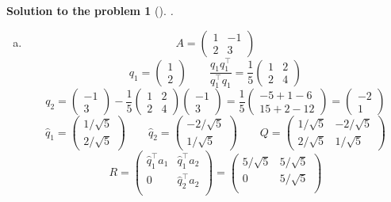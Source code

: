 \documentclass[12pt,a4]{article}
\newtheorem{solution}{Solution to the problem}
\begin{document}
\begin{solution}[]\rm .
\begin{enumerate}[(a)]
\item
\[
A = 
\begin{pmatrix}
1 & -1 \\
2 & 3
\end{pmatrix}
\]
\[
q_1 = \begin{pmatrix} 1 \\ 2  \end{pmatrix}
\qquad
\frac{q_1 q_1^\top}{q_1^\top q_1} =
\frac{1}{5}
\begin{pmatrix} 1 & 2 \\ 2 & 4 \end{pmatrix}
\]
\[
q_2 = \begin{pmatrix} -1 \\ 3  \end{pmatrix} - 
\frac{1}{5}
\begin{pmatrix} 1 & 2 \\ 2 & 4 \end{pmatrix}
\begin{pmatrix} -1 \\ 3  \end{pmatrix}
= \frac{1}{5}
\begin{pmatrix} -5 + 1 - 6 \\ 15 + 2 - 12 \end{pmatrix}
=
\begin{pmatrix} -2 \\ 1 \end{pmatrix}
\]
\[
\hat q_1 = \begin{pmatrix} 1/\sqrt5 \\ 2/\sqrt5  \end{pmatrix}
\qquad
\hat q_2 = \begin{pmatrix} -2/\sqrt5 \\ 1/\sqrt5 \end{pmatrix}
\qquad
Q =
\begin{pmatrix}
1/\sqrt5 & -2/\sqrt5 \\
2/\sqrt5 & 1/\sqrt5
\end{pmatrix}
\]
\[
R =
\begin{pmatrix}
\hat q_1^\top a_1 & \hat q_1^\top a_2 \\
0 & \hat q_2^\top a_2 \\
\end{pmatrix}
=
\begin{pmatrix}
5/\sqrt 5 & 5/\sqrt 5 \\
0 & 5/\sqrt 5 \\

\end{pmatrix}\]
\end{enumerate}
\end{solution}
\end{document}
